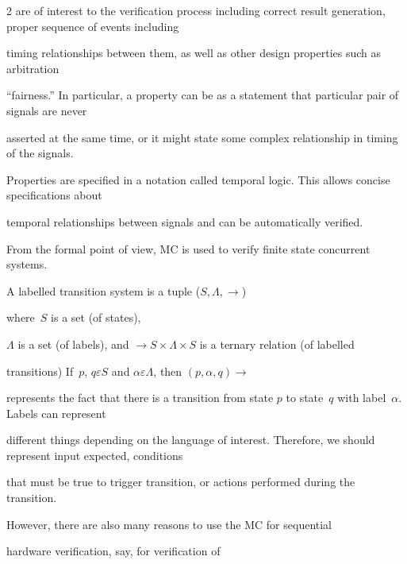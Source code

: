 \begin{multicols}{2}
are of interest to the verification process including correct result generation, proper sequence of events including


timing relationships between them, as well as other design properties such as arbitration


``fairness.'' In particular, a property can be as a statement that particular pair of signals are never


asserted at the same time, or it might state some complex relationship in timing of the signals.


{





}





   Properties are specified in a notation called temporal logic. This allows concise specifications about


temporal relationships between signals and can be automatically verified.





   From the formal point of view, MC is used to verify finite state concurrent systems.





    A labelled transition system is a tuple ($S, \Lambda , \rightarrow$)


where~$S$ is a set (of states),


$\Lambda$ is a set (of labels), and  $\rightarrow  S \times \Lambda \times S$ is a  ternary relation (of labelled


transitions) If\ $p$, $q \varepsilon S$ and $\alpha \varepsilon \Lambda$, then $(p,\alpha ,q)  \rightarrow$


represents the fact that there is a transition from state $p$ to state~$q$ with label~$\alpha$. Labels can represent


different things depending on the language of interest. Therefore, we should represent input expected, conditions


that must be true to trigger  transition, or actions performed during the transition.





   However, there are also many reasons to use the MC for sequential


hardware verification, say, for verification of



\end{multicols}
